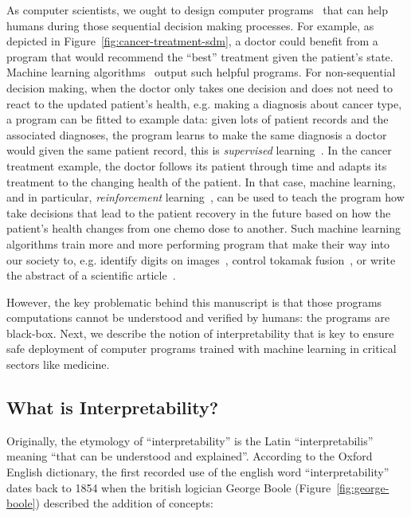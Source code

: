 As computer scientists, we ought to design computer programs~\cite{knuth63} that can help humans during those sequential decision making processes. 
For example, as depicted in Figure~\ref{fig:cancer-treatment-sdm}, a doctor could benefit from a program that would recommend the ``best'' treatment given the patient's state. 
Machine learning algorithms~\cite{turing} output such helpful programs.
For non-sequential decision making, when the doctor only takes one decision and does not need to react to the updated patient's health, e.g. making a diagnosis about cancer type, a program can be fitted to example data: given lots of patient records and the associated diagnoses, the program learns to make the same diagnosis a doctor would given the same patient record, this is \textit{supervised} learning~\cite{sl}. 
In the cancer treatment example, the doctor follows its patient through time and adapts its treatment to the changing health of the patient. In that case, machine learning, and in particular, \textit{reinforcement} learning~\cite{sutton}, can be used to teach the program how take decisions that lead to the patient recovery in the future based on how the patient's health changes from one chemo dose to another.  
Such machine learning algorithms train more and more performing program that make their way into our society to, e.g. identify digits on images~\cite{lenet}, control tokamak fusion~\cite{tokamak}, or write the abstract of a scientific article~\cite{bert}.

However, the key problematic behind this manuscript is that those programs computations cannot be understood and verified by humans: the programs are black-box.
Next, we describe the notion of interpretability that is key to ensure safe deployment of computer programs trained with machine learning in critical sectors like medicine.

\subsection{What is Interpretability?}


Originally, the etymology of ``interpretability'' is the Latin ``interpretabilis'' meaning ``that can be understood and explained''.
According to the Oxford English dictionary, the first recorded use of the english word ``interpretability'' dates back to 1854 when the british logician George Boole (Figure~\ref{fig:george-boole}) described the addition of concepts:

